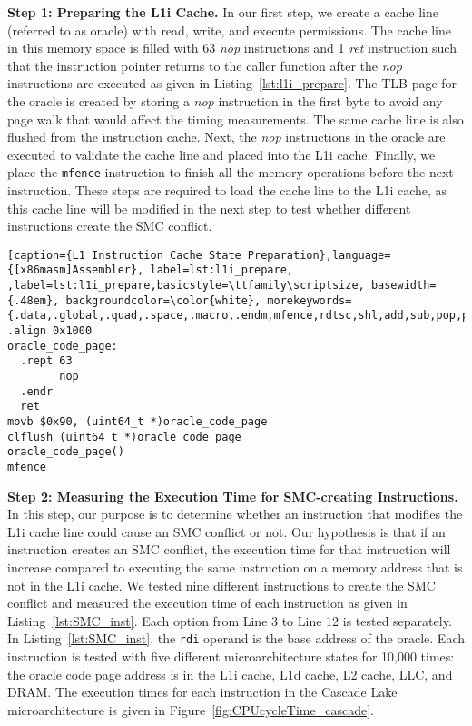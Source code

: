 \noindent\textbf{Step 1: Preparing the L1i Cache.}
In our first step, we create a cache line (referred to as oracle) with read, write, and execute permissions. 
The cache line in this memory space is filled with 63 \textit{nop} instructions and 1 \textit{ret} instruction such that the instruction pointer returns to the caller function after the \textit{nop} instructions are executed as given in Listing~\ref{lst:l1i_prepare}. 
The TLB page for the oracle is created by storing a \textit{nop} instruction in the first byte to avoid any page walk that would affect the timing measurements. 
The same cache line is also flushed from the instruction cache. 
Next, the \textit{nop} instructions in the oracle are executed to validate the cache line and placed into the L1i cache. 
Finally, we place the \texttt{mfence} instruction to finish all the memory operations before the next instruction. 
These steps are required to load the cache line to the L1i cache, as this cache line will be modified in the next step to test whether different instructions create the SMC conflict.

\begin{lstlisting}[caption={L1 Instruction Cache State Preparation},language={[x86masm]Assembler}, label=lst:l1i_prepare, ,label=lst:l1i_prepare,basicstyle=\ttfamily\scriptsize, basewidth={.48em}, backgroundcolor=\color{white}, morekeywords={.data,.global,.quad,.space,.macro,.endm,mfence,rdtsc,shl,add,sub,pop,push,ret,lea,.text,.align,.rept,.endr}]
.align 0x1000
oracle_code_page:
  .rept 63
        nop
  .endr
  ret
movb $0x90, (uint64_t *)oracle_code_page 
clflush (uint64_t *)oracle_code_page
oracle_code_page()                       
mfence

\end{lstlisting}

\noindent\textbf{Step 2: Measuring the Execution Time for SMC-creating Instructions.} In this step, our purpose is to determine whether an instruction that modifies the L1i cache line could cause an SMC conflict or not. 
Our hypothesis is that if an instruction creates an SMC conflict, the execution time for that instruction will increase compared to executing the same instruction on a memory address that is not in the L1i cache. 
We tested nine different instructions to create the SMC conflict and measured the execution time of each instruction as given in Listing~\ref{lst:SMC_inst}.
Each option from Line 3 to Line 12 is tested separately.
In Listing~\ref{lst:SMC_inst}, the \texttt{rdi} operand is the base address of the oracle. Each instruction is tested with five different microarchitecture states for 10,000 times: the oracle code page address is in the L1i cache, L1d cache, L2 cache, LLC, and DRAM.  
The execution times for each instruction in the Cascade Lake microarchitecture is given in Figure~\ref{fig:CPUcycleTime_cascade}.

